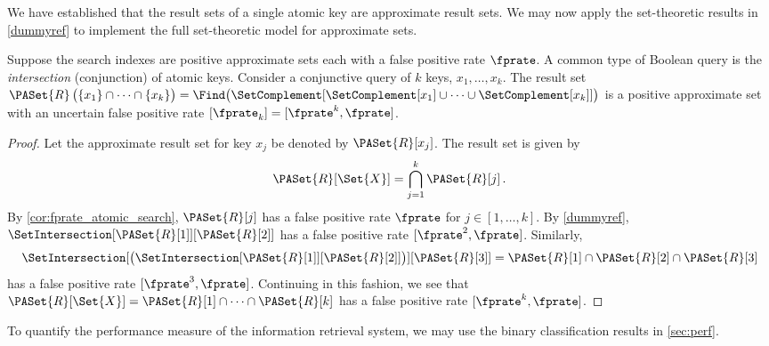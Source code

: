 \documentclass[ ../main.tex]{subfiles}
\begin{document}
We have established that the result sets of a single atomic key are approximate result sets. We may now apply the set-theoretic results in \cref{dummyref} to implement the full set-theoretic model for approximate sets.
\begin{example}
Suppose the search indexes are positive approximate sets each with a false positive rate $\fprate$. A common type of Boolean query is the \emph{intersection} (conjunction) of atomic keys. Consider a conjunctive query of $k$ keys, $x_1,\ldots,x_k$. The result set $\PASet{R}\left(\{x_1\} \cap \cdots \cap \{x_k\}\right) = \Find\!\left(\SetComplement[\SetComplement[x_1] \cup \cdots \cup \SetComplement[x_k]]\right)$ is a positive approximate set with an uncertain false positive rate $[\fprate_k] = [\fprate^k, \fprate]$.
\begin{proof}
Let the approximate result set for key $x_j$ be denoted by $\PASet{R}[x_j]$. The result set is given by
\begin{equation}
    \PASet{R}[\Set{X}] = \bigcap_{j=1}^{k} \PASet{R}[j]\,.
\end{equation}
By \cref{cor:fprate_atomic_search}, $\PASet{R}[j]$ has a false positive rate $\fprate$ for $j \in [1,\ldots,k]$. By \cref{dummyref}, $\SetIntersection[\PASet{R}[1]][\PASet{R}[2]]$ has a false positive rate $[\fprate^2,\fprate]$. Similarly,
\begin{equation}
\SetIntersection[\left(\SetIntersection[\PASet{R}[1]][\PASet{R}[2]]\right)][\PASet{R}[3]] = \PASet{R}[1] \cap \PASet{R}[2] \cap \PASet{R}[3]    
\end{equation}
has a false positive rate $[\fprate^3,\fprate]$. Continuing in this fashion, we see that $\PASet{R}[\Set{X}] = \PASet{R}[1] \cap \cdots \cap \PASet{R}[k]$ has a false positive rate $[\fprate^k,\fprate]$.
\end{proof}
\end{example}

To quantify the performance measure of the information retrieval system, we may use the binary classification results in \cref{sec:perf}.
\end{document}
